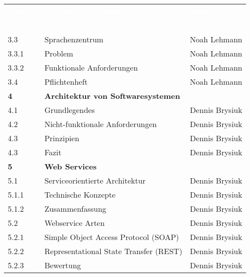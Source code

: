 \begin{table}[H]
\begin{center}
  \begin{tabular}{| l | l | l |}
 
\hline
\rowcolor{Gray}
\textcolor{white}{\textbf{Kapitel}} & \textcolor{white}{\textbf{Kapitel Bezeichnung}} & \textcolor{white}{\textbf{Autor}} \\
\rowcolor{Gray}
\textcolor{white}{\textbf{Nr.}} 	&  												  & \\  

\hline
3.3		& Sprachenzentrum				& Noah Lehmann	\\
\hline
3.3.1	& Problem						& Noah Lehmann	\\
\hline
3.3.2	& Funktionale Anforderungen		& Noah Lehmann	\\
\hline
3.4		& Pflichtenheft					& Noah Lehmann	\\

\hline    
\rowcolor{LGray} 						
\textbf{4}	& \textbf{Architektur von Softwaresystemen}	&	\\
\hline
4.1		& Grundlegendes						& Dennis Brysiuk \\
\hline
4.2		& Nicht-funktionale Anforderungen	& Dennis Brysiuk \\
\hline
4.3		& Prinzipien						& Dennis Brysiuk \\
\hline
4.3		& Fazit								& Dennis Brysiuk \\

\hline    
\rowcolor{LGray}
\textbf{5}		& \textbf{Web Services}	&  			\\
\hline
5.1		& Serviceorientierte Architektur			& Dennis Brysiuk \\
\hline
5.1.1	& Technische Konzepte						& Dennis Brysiuk \\
\hline
5.1.2	& Zusammenfassung							& Dennis Brysiuk \\
\hline
5.2		& Webservice Arten							& Dennis Brysiuk \\
\hline
5.2.1	& Simple Object Access Protocol (SOAP)		& Dennis Brysiuk \\
\hline
5.2.2	& Representational State Transfer (REST)	& Dennis Brysiuk \\
\hline
5.2.3	& Bewertung									& Dennis Brysiuk \\


\end{tabular}
\end{center}
\end{table}
